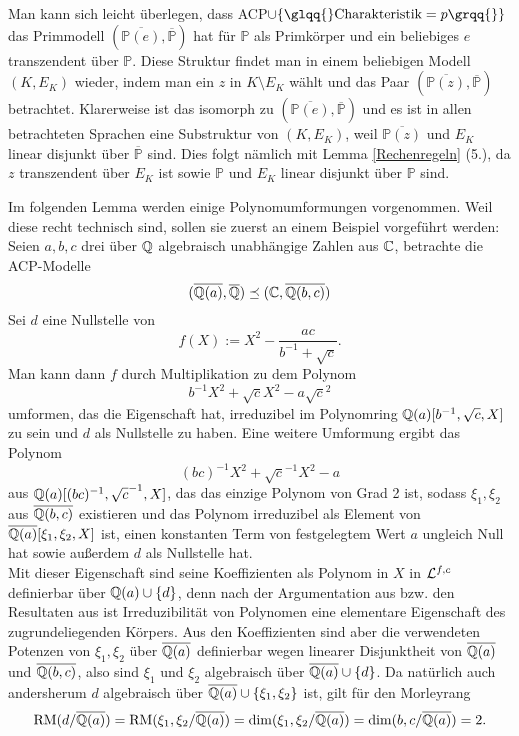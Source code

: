     \begin{remark}
    	Man kann sich leicht überlegen, dass ACP$\cup\{\glqq{}\text{Charakteristik}=p\grqq{}\}$ das Primmodell $(\overline{\mathbb{P}(e)},\overline{\mathbb{P}})$ hat für $\mathbb{P}$ als Primkörper und ein beliebiges $e$ transzendent über $\mathbb{P}$. Diese Struktur findet man in einem beliebigen Modell $(K,E_K)$ wieder, indem man ein $z$ in $K\setminus E_K$ wählt und das Paar $(\overline{\mathbb{P}(z)},\overline{\mathbb{P}})$ betrachtet. Klarerweise ist das isomorph zu $(\overline{\mathbb{P}(e)},\overline{\mathbb{P}})$ und es ist in allen betrachteten Sprachen eine Substruktur von $(K,E_K)$, weil $\overline{\mathbb{P}(z)}$ und $E_K$ linear disjunkt über $\overline{\mathbb{P}}$ sind. Dies folgt nämlich mit Lemma \ref{Rechenregeln} (5.), da $z$ transzendent über $E_K$ ist sowie $\mathbb{P}$ und $E_K$ linear disjunkt über $\mathbb{P}$ sind.
    \end{remark}
    \newpage
    Im folgenden Lemma werden einige Polynomumformungen vorgenommen. Weil diese recht technisch sind, sollen sie zuerst an einem Beispiel vorgeführt werden: Seien $a,b,c$ drei über $\mathbb{Q}$ algebraisch unabhängige Zahlen aus $\mathbb{C}$, betrachte die ACP-Modelle $$(\overline{\mathbb{Q}(a)},\overline{\mathbb{Q}})\preceq(\mathbb{C},\overline{\mathbb{Q}(b,c)})$$ Sei $d$ eine Nullstelle von $$f(X):=X^2-\frac{ac}{b^{-1}+\sqrt{c}}.$$ Man kann dann $f$ durch Multiplikation zu dem Polynom $$b^{-1}X^2+\sqrt{c}X^2-a\sqrt{c}^2$$ umformen, das die Eigenschaft hat, irreduzibel im Polynomring $\mathbb{Q}(a)[b^{-1},\sqrt{c},X]$ zu sein und $d$ als Nullstelle zu haben. Eine weitere Umformung ergibt das Polynom $$(bc)^{-1}X^2+\sqrt{c}^{-1}X^2-a$$ aus $\mathbb{Q}(a)[(bc)^{-1},\sqrt{c}^{-1},X]$, das das einzige Polynom von Grad 2 ist, sodass $\xi_1,\xi_2$ aus $\overline{\mathbb{Q}(b,c)}$ existieren und das Polynom irreduzibel als Element von $\overline{\mathbb{Q}(a)}[\xi_1,\xi_2,X]$ ist, einen konstanten Term von festgelegtem Wert $a$ ungleich Null hat sowie außerdem $d$ als Nullstelle hat.\\
    Mit dieser Eigenschaft sind seine Koeffizienten als Polynom in $X$ in $\mathcal{L}^{f,c}$ definierbar über $\mathbb{Q}(a)\cup\{d\}$, denn nach der Argumentation aus \cite{Chatzidakis} bzw. den Resultaten aus \cite{Schmidt} ist Irreduzibilität von Polynomen eine elementare Eigenschaft des zugrundeliegenden Körpers. Aus den Koeffizienten sind aber die verwendeten Potenzen von $\xi_1,\xi_2$ über $\overline{\mathbb{Q}(a)}$ definierbar wegen linearer Disjunktheit von $\overline{\mathbb{Q}(a)}$ und $\overline{\mathbb{Q}(b,c)}$, also sind $\xi_1$ und $\xi_2$ algebraisch über $\overline{\mathbb{Q}(a)}\cup\{d\}$. Da natürlich auch andersherum $d$ algebraisch über $\overline{\mathbb{Q}(a)}\cup\{\xi_1,\xi_2\}$ ist, gilt für den Morleyrang $$\operatorname{RM}(d/\overline{\mathbb{Q}(a)})=\operatorname{RM}(\xi_1,\xi_2/\overline{\mathbb{Q}(a)})=\dim(\xi_1,\xi_2/\overline{\mathbb{Q}(a)})=\dim(b,c/\overline{\mathbb{Q}(a)})=2.$$
